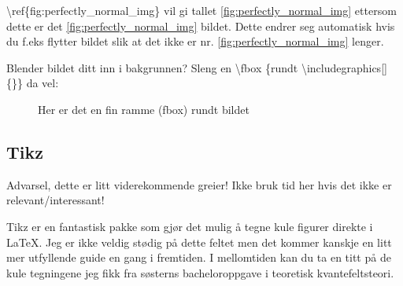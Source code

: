         \textbackslash ref\{fig:perfectly\_normal\_img\} vil gi tallet \ref{fig:perfectly_normal_img} ettersom dette er det \ref{fig:perfectly_normal_img} bildet. Dette endrer seg automatisk hvis du f.eks flytter bildet slik at det ikke er nr. \ref{fig:perfectly_normal_img} lenger.
        
        Blender bildet ditt inn i bakgrunnen? Sleng en \textbackslash fbox \{rundt \textbackslash includegraphics[]\{\}\} da vel:
        
        \begin{figure}[H]
            \centering 
            \caption{Her er det en fin ramme (fbox) rundt bildet}
            \label{fig:bordered_img}
        \end{figure}
        
        
        
    \subsection{Tikz}
        Advarsel, dette er litt viderekommende greier! Ikke bruk tid her hvis det ikke er relevant/interessant! 
        
        Tikz er en fantastisk pakke som gjør det mulig å tegne kule figurer direkte i \LaTeX. Jeg er ikke veldig stødig på dette feltet men det kommer kanskje en litt mer utfyllende guide en gang i fremtiden. I mellomtiden kan du ta en titt på de kule tegningene jeg fikk fra søsterns bacheloroppgave i teoretisk kvantefeltsteori. 

